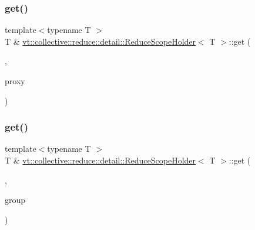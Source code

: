 \mbox{\label{structvt_1_1collective_1_1reduce_1_1detail_1_1_reduce_scope_holder_aa20f0ff351bc6bcccea68e8cd4651969}} 
\subsubsection{\texorpdfstring{get()}{get()}\hspace{0.1cm}{\footnotesize\ttfamily [3/6]}}
{\footnotesize\ttfamily template$<$typename T $>$ \\
T \& \hyperlink{structvt_1_1collective_1_1reduce_1_1detail_1_1_reduce_scope_holder}{vt\+::collective\+::reduce\+::detail\+::\+Reduce\+Scope\+Holder}$<$ T $>$\+::get (\begin{DoxyParamCaption}\item[{\hyperlink{structvt_1_1collective_1_1reduce_1_1detail_1_1_reduce_scope_holder_1_1_vrt_proxy_tag}{Vrt\+Proxy\+Tag}}]{,  }\item[{\hyperlink{namespacevt_a1b417dd5d684f045bb58a0ede70045ac}{Virtual\+Proxy\+Type}}]{proxy }\end{DoxyParamCaption})}

\mbox{\label{structvt_1_1collective_1_1reduce_1_1detail_1_1_reduce_scope_holder_a666bfa6fa622e3954d6f1a267de48c2e}} 
\subsubsection{\texorpdfstring{get()}{get()}\hspace{0.1cm}{\footnotesize\ttfamily [4/6]}}
{\footnotesize\ttfamily template$<$typename T $>$ \\
T \& \hyperlink{structvt_1_1collective_1_1reduce_1_1detail_1_1_reduce_scope_holder}{vt\+::collective\+::reduce\+::detail\+::\+Reduce\+Scope\+Holder}$<$ T $>$\+::get (\begin{DoxyParamCaption}\item[{\hyperlink{structvt_1_1collective_1_1reduce_1_1detail_1_1_reduce_scope_holder_1_1_group_tag}{Group\+Tag}}]{,  }\item[{\hyperlink{namespacevt_a27b5e4411c9b6140c49100e050e2f743}{Group\+Type}}]{group }\end{DoxyParamCaption})}

